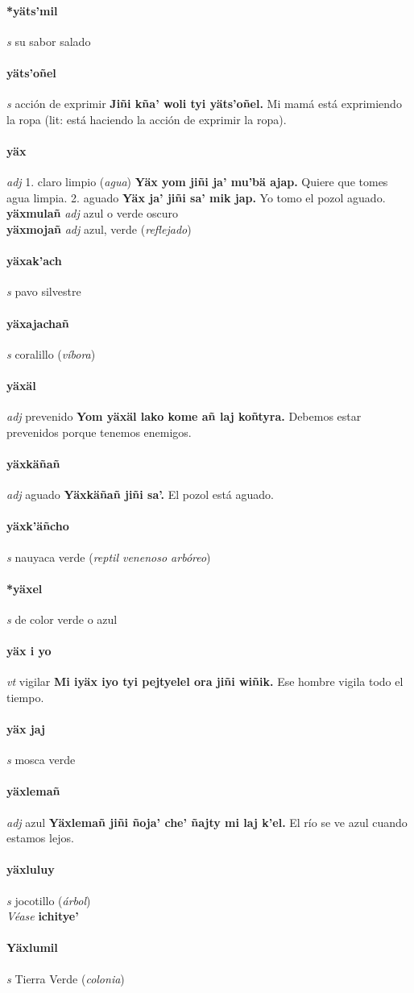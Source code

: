\documentclass{scrbook}
\newcommand{\entry}[1]{\paragraph{#1}}
\newcommand{\onedefinition}[1]{#1.}
\newcommand{\partofspeech}[1]{\textit{#1}}
\newcommand{\spanishtranslation}[1]{#1}
\newcommand{\clarification}[1]{(\textit{#1})}
\newcommand{\cholexample}[1]{\textbf{#1}}
\newcommand{\exampletranslation}[1]{#1}
\newcommand{\alsosee}[1]{\\\textit{Véase} \textbf{#1}}
\newcommand{\secondaryentry}[1]{\\\textbf{#1}}
\newcommand{\secondpartofspeech}[1]{\textit{#1}}
\newcommand{\secondtranslation}[1]{#1}
\begin{document}
\begin{multicols}{2}
\entry{*yäts'mil}
\partofspeech{s}
\spanishtranslation{su sabor salado}

\entry{yäts'oñel}
\partofspeech{s}
\spanishtranslation{acción de exprimir}
\cholexample{Jiñi kña' woli tyi yäts'oñel.}
\exampletranslation{Mi mamá está exprimiendo la ropa (lit: está haciendo la acción de exprimir la ropa).}

\entry{yäx}
\partofspeech{adj}
\onedefinition{1}
\spanishtranslation{claro}
\spanishtranslation{limpio}
\clarification{agua}
\cholexample{Yäx yom jiñi ja' mu'bä ajap.}
\exampletranslation{Quiere que tomes agua limpia.}
\onedefinition{2}
\spanishtranslation{aguado}
\cholexample{Yäx ja' jiñi sa' mik jap.}
\exampletranslation{Yo tomo el pozol aguado.}
\secondaryentry{yäxmulañ}
\secondpartofspeech{adj}
\secondtranslation{azul o verde oscuro}
\secondaryentry{yäxmojañ}
\secondpartofspeech{adj}
\secondtranslation{azul, verde}
\clarification{reflejado}

\entry{yäxak'ach}
\partofspeech{s}
\spanishtranslation{pavo silvestre}

\entry{yäxajachañ}
\partofspeech{s}
\spanishtranslation{coralillo}
\clarification{víbora}

\entry{yäxäl}
\partofspeech{adj}
\spanishtranslation{prevenido}
\cholexample{Yom yäxäl lako kome añ laj koñtyra.}
\exampletranslation{Debemos estar prevenidos porque tenemos enemigos.}

\entry{yäxkäñañ}
\partofspeech{adj}
\spanishtranslation{aguado}
\cholexample{Yäxkäñañ jiñi sa'.}
\exampletranslation{El pozol está aguado.}

\entry{yäxk'äñcho}
\partofspeech{s}
\spanishtranslation{nauyaca verde}
\clarification{reptil venenoso arbóreo}

\entry{*yäxel}
\partofspeech{s}
\spanishtranslation{de color verde o azul}

\entry{yäx i yo}
\partofspeech{vt}
\spanishtranslation{vigilar}
\cholexample{Mi iyäx iyo tyi pejtyelel ora jiñi wiñik.}
\exampletranslation{Ese hombre vigila todo el tiempo.}

\entry{yäx jaj}
\partofspeech{s}
\spanishtranslation{mosca verde}

\entry{yäxlemañ}
\partofspeech{adj}
\spanishtranslation{azul}
\cholexample{Yäxlemañ jiñi ñoja' che' ñajty mi laj k'el.}
\exampletranslation{El río se ve azul cuando estamos lejos.}

\entry{yäxluluy}
\partofspeech{s}
\spanishtranslation{jocotillo}
\clarification{árbol}
\alsosee{ichitye'}

\entry{Yäxlumil}
\partofspeech{s}
\spanishtranslation{Tierra Verde}
\clarification{colonia}


\end{multicols}
\end{document}
